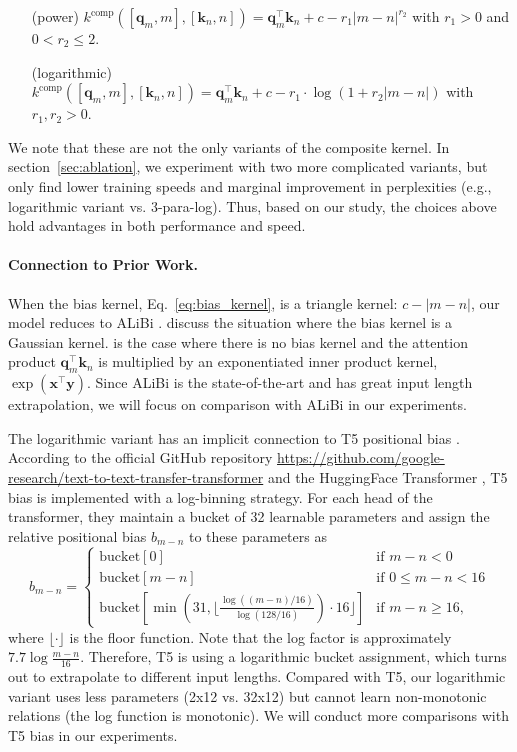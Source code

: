 \begin{enumerate}[topsep=-3pt, itemsep=-1pt,label=(\alph*),leftmargin=22mm]
    \item[(power)] $k^{\text{comp}}([\bm q_m,m],[\bm k_n,n])= \bm q_m^\top \bm k_n +c-r_1|m-n|^{r_2}$ with $r_1>0$ and $0<r_2\leq 2$.
    \item[(logarithmic)] $k^{\text{comp}}([\bm q_m,m],[\bm k_n,n])= \bm q_m^\top \bm k_n +c-r_1\cdot \log(1+r_2|m-n|)$ with $r_1,r_2>0$.
\end{enumerate}
We note that these are not the only variants of the composite kernel. In section~\ref{sec:ablation}, we experiment with two more complicated variants, but only find lower training speeds and marginal improvement in perplexities (e.g., logarithmic variant vs. 3-para-log). Thus, based on our study, the choices above hold advantages in both performance and speed. 

\paragraph{Connection to Prior Work.} When the bias kernel, Eq.~\eqref{eq:bias_kernel}, is a triangle kernel: $c-|m-n|$, our model reduces to ALiBi \citep{press2022train}. \citet{wennberg2021case} discuss the situation where the bias kernel is a Gaussian kernel. \citet{tsai2019transformer} is the case where there is no bias kernel and the attention product $\bm q_m^\top \bm k_n$ is multiplied by an exponentiated inner product kernel, $\exp(\bm x^\top \bm y)$. Since ALiBi is the state-of-the-art and has great input length extrapolation, we will focus on comparison with ALiBi in our experiments.

The logarithmic variant has an implicit connection to T5 positional bias \citep{raffel2019exploring}. According to the official GitHub repository \url{https://github.com/google-research/text-to-text-transfer-transformer} and the HuggingFace Transformer \citep{wolf2020huggingface}, T5 bias is implemented with a log-binning strategy. For each head of the transformer, they maintain a bucket of 32 learnable parameters and assign the relative positional bias $b_{m-n}$ to these parameters as
$$
b_{m-n}=\begin{cases}
\text{bucket}[0] & \text{if~}m-n< 0\\
\text{bucket}[m-n] & \text{if~}0\leq m-n<16\\
\text{bucket}[\min(31, \lfloor \frac{\log((m-n)/16)}{\log(128/16)})\cdot 16\rfloor] & \text{if~}m-n\geq 16,
\end{cases}
$$
where $\lfloor\cdot\rfloor$ is the floor function. Note that the log factor is approximately $7.7\log\frac{m-n}{16}$. Therefore, T5 is using a logarithmic bucket assignment, which turns out to extrapolate to different input lengths. Compared with T5, our logarithmic variant uses less parameters (2x12 vs. 32x12) but cannot learn non-monotonic relations (the log function is monotonic). We will conduct more comparisons with T5 bias in our experiments.

